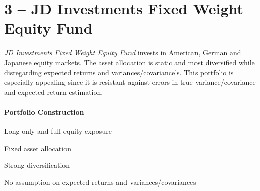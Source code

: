 \documentclass{scrreprt}
\begin{document}
\newpage\section*{3 -- JD Investments Fixed Weight Equity Fund}
\textit{JD Investments Fixed Weight Equity Fund} invests in American, German and Japanese equity markets.
The asset allocation is static and most diversified while disregarding expected returns and variances/covariance’s.
This portfolio is especially appealing since it is resistant against errors in true variance/covariance and expected return estimation.

\paragraph{Portfolio Construction}
\begin{sit}
\item	Long only and full equity exposure
\item	Fixed asset allocation
\item	Strong diversification
\item	No assumption on expected returns and variances/covariances
\end{sit}

\begin{figure}[H]
\end{figure}
\end{document}
